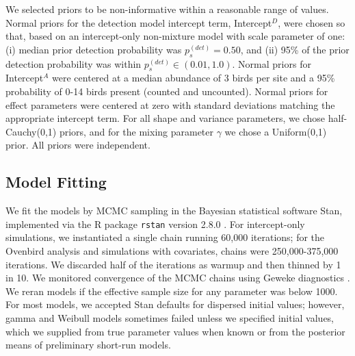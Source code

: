\documentclass[useAMS,usenatbib,referee,12pt]{article}
\begin{document}
We selected priors to be non-informative within a reasonable range of values.  
Normal priors for the detection model intercept term, Intercept$^D$, were chosen so that, based on an intercept-only non-mixture model with scale parameter of one: (i) median prior detection probability was $p_{s}^{(det)} = 0.50$, and (ii) 95\% of the prior detection probability was within $p_{s}^{(det)} \in (0.01, 1.0)$.  
Normal priors for Intercept$^A$ were centered at a median abundance of 3 birds per site and a 95\% probability of 0-14 birds present (counted and uncounted).  
Normal priors for effect parameters were centered at zero with standard deviations matching the appropriate intercept term.  
For all shape and variance parameters, we chose half-Cauchy(0,1) priors, and for the mixing parameter $\gamma$ we chose a Uniform(0,1) prior.  
All priors were independent.





\subsection{Model Fitting}

We fit the models by MCMC sampling in the Bayesian statistical software Stan, implemented via the R package \texttt{rstan} version 2.8.0 \citep{Rstan2015}.  
For intercept-only simulations, we instantiated a single chain running 60,000 iterations; for the Ovenbird analysis and simulations with covariates, chains were 250,000-375,000 iterations.  
We discarded half of the iterations as warmup and then thinned by 1 in 10.  
We monitored convergence of the MCMC chains using Geweke diagnostics \citep{Geweke1991}.  
We reran models if the effective sample size for any parameter was below 1000.  
For most models, we accepted Stan defaults for dispersed initial values; however, gamma and Weibull models sometimes failed unless we specified initial values, which we supplied from true parameter values when known or from the posterior means of preliminary short-run models.
\end{document}
